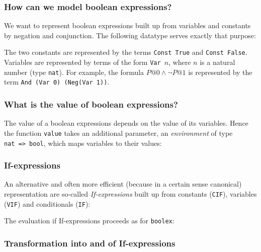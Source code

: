 \subsubsection{How can we model boolean expressions?}

We want to represent boolean expressions built up from variables and
constants by negation and conjunction. The following datatype serves exactly
that purpose:
\begin{ttbox}
\end{ttbox}
The two constants are represented by the terms \texttt{Const~True} and
\texttt{Const~False}. Variables are represented by terms of the form
\texttt{Var}~$n$, where $n$ is a natural number (type \texttt{nat}).
For example, the formula $P@0 \land \neg P@1$ is represented by the term
\texttt{And~(Var~0)~(Neg(Var~1))}.

\subsubsection{What is the value of boolean expressions?}

The value of a boolean expressions depends on the value of its variables.
Hence the function \texttt{value} takes an additional parameter, an {\em
  environment} of type \texttt{nat~=>~bool}, which maps variables to their
values:
\begin{ttbox}
\end{ttbox}

\subsubsection{If-expressions}

An alternative and often more efficient (because in a certain sense
canonical) representation are so-called \textit{If-expressions\/} built up
from constants (\texttt{CIF}), variables (\texttt{VIF}) and conditionals
(\texttt{IF}):
\begin{ttbox}
\end{ttbox}
The evaluation if If-expressions proceeds as for \texttt{boolex}:
\begin{ttbox}
\end{ttbox}

\subsubsection{Transformation into and of If-expressions}

